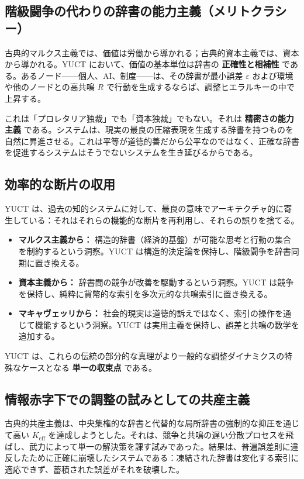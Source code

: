 \documentclass[12pt,a4paper]{article}
\newcommand{\Keff}{K_{\mathrm{eff}}}
\begin{document}
	\subsection{階級闘争の代わりの辞書の能力主義（メリトクラシー）}
	
	古典的マルクス主義では、価値は労働から導かれる；古典的資本主義では、資本から導かれる。YUCT において、価値の基本単位は辞書の \textbf{正確性と相補性} である。あるノード――個人、AI、制度――は、その辞書が最小誤差 \(\varepsilon\) および環境や他のノードとの高共鳴 \(R\) で行動を生成するならば、調整ヒエラルキーの中で上昇する。
	
	これは「プロレタリア独裁」でも「資本独裁」でもない。それは \textbf{精密さの能力主義} である。システムは、現実の最良の圧縮表現を生成する辞書を持つものを自然に昇進させる。これは平等が道徳的善だから公平なのではなく、正確な辞書を促進するシステムはそうでないシステムを生き延びるからである。
	
	\subsection{効率的な断片の収用}
	
	YUCT は、過去の知的システムに対して、最良の意味でアーキテクチャ的に寄生している：それはそれらの機能的な断片を再利用し、それらの誤りを捨てる。
	
	\begin{itemize}[leftmargin=*]
		\item \textbf{マルクス主義から：} 構造的辞書（経済的基盤）が可能な思考と行動の集合を制約するという洞察。YUCT は構造的決定論を保持し、階級闘争を辞書同期に置き換える。
		\item \textbf{資本主義から：} 辞書間の競争が改善を駆動するという洞察。YUCT は競争を保持し、純粋に貨幣的な索引を多次元的な共鳴索引に置き換える。
		\item \textbf{マキャヴェッリから：} 社会的現実は道徳的訴えではなく、索引の操作を通じて機能するという洞察。YUCT は実用主義を保持し、誤差と共鳴の数学を追加する。
	\end{itemize}
	
	YUCT は、これらの伝統の部分的な真理がより一般的な調整ダイナミクスの特殊なケースとなる \textbf{単一の収束点} である。
	
	\subsection{情報赤字下での調整の試みとしての共産主義}
	
	古典的共産主義は、中央集権的な辞書と代替的な局所辞書の強制的な抑圧を通じて高い \(\Keff\) を達成しようとした。それは、競争と共鳴の遅い分散プロセスを飛ばし、武力によって単一の解決策を課す試みであった。結果は、普遍誤差則に違反したために正確に崩壊したシステムである：凍結された辞書は変化する索引に適応できず、蓄積された誤差がそれを破壊した。
	
\end{document}
